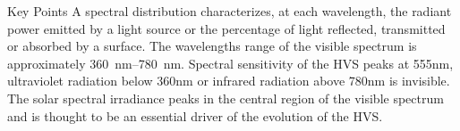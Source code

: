 Key Points
A spectral distribution characterizes, at each wavelength, the radiant power emitted by a light source or the percentage of light reflected, transmitted or absorbed by a surface.
The wavelengths range of the visible spectrum is approximately \SIrange{360}{780}{\nm}.
Spectral sensitivity of the HVS peaks at 555nm, ultraviolet radiation below 360nm or infrared radiation above 780nm is invisible.
The solar spectral irradiance peaks in the central region of the visible spectrum and is thought to be an essential driver of the evolution of the HVS.


